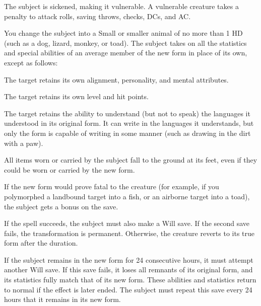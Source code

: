 \begin{comment}
\subsubsection{B}
\end{comment}

\begin{spellhealthy}
  The subject is sickened, making it vulnerable. A vulnerable creature takes a  penalty to attack rolls, saving throws, checks, DCs, and AC.
\end{spellhealthy}
\begin{spellblood}
  You change the subject into a Small or smaller animal of no more than 1 HD (such as a dog, lizard, monkey, or toad). The subject takes on all the statistics and special abilities of an average member of the new form in place of its own, except as follows:
  \begin{itemize*} 
    \item The target retains its own alignment, personality, and mental attributes.
    \item The target retains its own level and hit points.
    \item The target retains the ability to understand (but not to speak) the languages it understood in its original form. It can write in the languages it understands, but only the form is capable of writing in some manner (such as drawing in the dirt with a paw). 
  \end{itemize*}

  All items worn or carried by the subject fall to the ground at its feet, even if they could be worn or carried by the new form. 

  If the new form would prove fatal to the creature (for example, if you polymorphed a landbound target into a fish, or an airborne target into a toad), the subject gets a  bonus on the save. 

  If the spell succeeds, the subject must also make a Will save. If the second save fails, the transformation is permanent. Otherwise, the creature reverts to its true form after the \durshort duration.

  If the subject remains in the new form for 24 consecutive hours, it must attempt another Will save. If this save fails, it loses all remnants of its original form, and its statistics fully match that of its new form. These abilities and statistics return to normal if the effect is later ended. The subject must repeat this save every 24 hours that it remains in its new form.
\end{spellblood}
